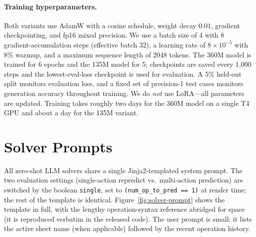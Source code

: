 \documentclass{article}
\theoremstyle{plain}
\theoremstyle{definition}
\theoremstyle{remark}
\begin{document}
\paragraph{Training hyperparameters.}
Both variants use AdamW with a cosine schedule, weight decay $0.01$, gradient checkpointing,
and fp16 mixed precision.
We use a batch size of 4 with 8 gradient-accumulation steps (effective batch 32), a
learning rate of $8\!\times\!10^{-5}$ with 8\% warmup, and a maximum sequence length of
2048 tokens.
The 360M model is trained for 6 epochs and the 135M model for 5; checkpoints are saved
every 1{,}000 steps and the lowest-eval-loss checkpoint is used for evaluation.
A 5\% held-out split monitors evaluation loss, and a fixed set of precision-1 test cases
monitors generation accuracy throughout training.
We do \emph{not} use LoRA---all parameters are updated.
Training takes roughly two days for the 360M model on a single T4 GPU and about a day for
the 135M variant.


\section{Solver Prompts}\label{app:prompts}

All zero-shot LLM solvers share a single Jinja2-templated system prompt.
The two evaluation settings (single-action repredict vs.\ multi-action prediction) are
switched by the boolean \texttt{single}, set to \texttt{(num\_op\_to\_pred == 1)} at render
time; the rest of the template is identical.
Figure~\ref{fig:solver-prompt} shows the template in full, with the lengthy operation-syntax
reference abridged for space (it is reproduced verbatim in the released code).
The user prompt is small: it lists the active sheet name (when applicable) followed by the
recent operation history.
\end{document}
